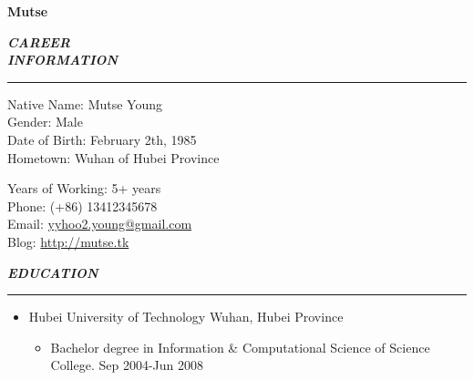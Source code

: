 \documentclass[a4paper, 10pt, titlepage]{article}
\newcommand{\wuhao}{\fontsize{10.5pt}{10.5pt}\selectfont}   %
\begin{document}
\renewcommand{\normalsize}{\wuhao}         %

\setlength{\parindent}{0em}                    
\newcommand{\mysection}[1]{\vspace{5pt} {\bfseries \textsl{#1}} \\ {\color{gray} \rule[5pt]{\textwidth}{0.3pt}}}
\renewcommand{\labelitemi}{$\bullet$}

\newcommand{\cvtitle}[1]{\centerline{\huge \textbf{#1}} \bigskip}
\newcommand{\career}[2]{\vspace{5pt} {{\bfseries \textsl{#1}} \hspace{5pt} {\normalsize{#2}}} \\}
\pagestyle{empty}

\cvtitle{Mutse}
\career{CAREER}{Linux Software Engineer}

\mysection{INFORMATION}
\begin{minipage}[t]{0.495\textwidth}
  Native Name: Mutse Young \\
  Gender: Male \\
  Date of Birth: February 2th, 1985\\
  Hometown: Wuhan of Hubei Province
\end{minipage}
\begin{minipage}[t]{0.495\textwidth}
  Years of Working: 5+ years\\
  Phone: (+86) 13412345678 \\
  Email: \href{mailto:yyhoo2.young@gmail.com}{yyhoo2.young@gmail.com} \\
  Blog: \href{http://mutse.tk}{http://mutse.tk}
\end{minipage}

\vspace{3mm}
\mysection{EDUCATION}
\begin{itemize}

\item Hubei University of Technology \hfill \textrm{Wuhan, Hubei Province}
  \begin{itemize}
  \item Bachelor degree in Information \& Computational Science of Science College.  \hfill \textrm{Sep 2004-Jun 2008}
  \end{itemize}

\end{itemize}
\end{document}
